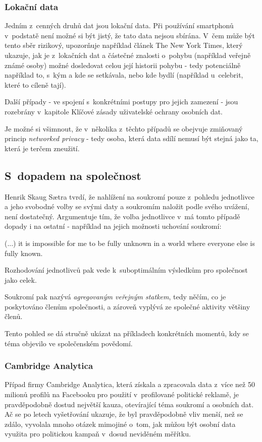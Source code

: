 \subsubsection{Lokační data}
Jedním z~cenných druhů dat jsou lokační data. Při používání smartphonů v~podstatě není možné si být jistý, že tato data nejsou sbírána. V~čem může být tento sběr rizikový, upozorňuje například článek The New York Times\citep{location-data}, který ukazuje, jak je z~lokačních dat a částečné znalosti o~pohybu (například veřejně známé osoby) možné dosledovat celou její historii pohybu - tedy potenciálně například to, s~kým a kde se setkávala, nebo kde bydlí (například u~celebrit, které to cíleně tají).   


Další případy - ve spojení s~konkrétními postupy pro jejich zamezení - jsou rozebrány v~kapitole Klíčové zásady uživatelské ochrany osobních dat.

Je možné si všimnout, že v~několika z~těchto případů se obejvuje zmiňovaný princip \textit{networked privacy} - tedy osoba, která data sdílí nemusí být stejná jako ta, která je terčem zneužití.

\subsection{S~dopadem na společnost}
Henrik Skaug Sætra tvrdí, že nahlížení na soukromí pouze z~pohledu jednotlivce a jeho svobodné volby se svými daty a soukromím naložit podle svého uvážení, není dostatečný\citep{privacy-as-aggregate-public-good}. Argumentuje tím, že volba jednotlivce v~má tomto případě dopady i na ostatní - například na jejich možnosti uchování soukromí:

\begin{displayquote}
(...) it is impossible for me to be fully unknown in a world where everyone else is fully known.
\end{displayquote}

Rozhodování jednotlivců pak vede k~suboptimálním výsledkům pro společnost jako celek.

Soukromí pak nazývá \textit{agregovaným veřejným statkem}, tedy něčím, co je poskytováno členům společnosti, a zároveň vyplývá ze společné aktivity většiny členů.

Tento pohled se dá stručně ukázat na příkladech konkrétních momentů, kdy se téma objevilo ve společenském povědomí.

\subsubsection{Cambridge Analytica}
Případ firmy Cambridge Analytica, která získala a zpracovala data z~více než 50 milionů profilů na Facebooku\citep{cambridge-analytica} pro použití v~profilované politické reklamě, je pravděpodobně dostud největší kauza, otevírající téma soukromí a osobních dat. Ač se po letech vyšetřování ukazuje, že byl pravděpodobně vliv menší, než se zdálo\citep{ca-brexit}\citep{ca-elections}, vyvolala mnoho otázek mimojiné o~tom, jak můžou být osobní data využita pro politickou kampaň v~dosud neviděném měřítku.

